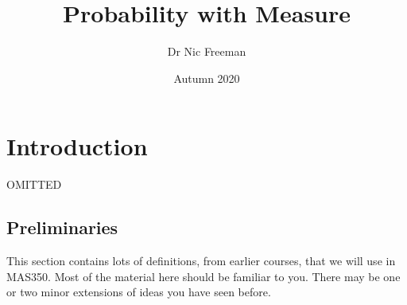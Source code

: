 \documentclass[a4paper]{report}
\title{Probability with Measure}
\author{Dr Nic Freeman}
\date{Autumn 2020}
\numberwithin{equation}{chapter}
\numberwithin{thm_counter}{section}
\begin{document}
\maketitle


\fontsize{11pt}{15.0pt}
\selectfont

\newpage \thispagestyle{empty} 

\tableofcontents

\setcounter{chapter}{-1}

\chapter{Introduction}
OMITTED

\newpage
\section{Preliminaries}

This section contains lots of definitions, from earlier courses, that we will use in MAS350. Most of the material here should be familiar to you. There may be one or two minor extensions of ideas you have seen before.
\end{document}
